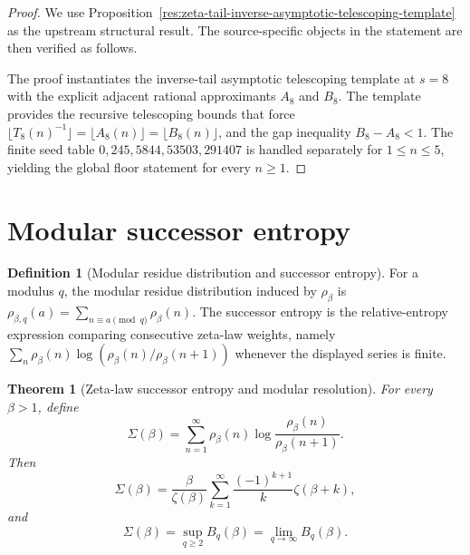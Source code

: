 \documentclass[11pt]{article}
\numberwithin{equation}{section}
\newtheorem{theorem}{Theorem}[section]
\theoremstyle{definition}
\newtheorem{definition}{Definition}[section]
\theoremstyle{remark}
\newcommand{\1}{\mathbf 1}
\begin{document}
\begin{proof}
We use Proposition~\ref{res:zeta-tail-inverse-asymptotic-telescoping-template} as the upstream structural result. The source-specific objects in the statement are then verified as follows.

The proof instantiates the inverse-tail asymptotic telescoping template at \(s=8\) with the explicit adjacent rational approximants \(A_8\) and \(B_8\). The template provides the recursive telescoping bounds that force \(\lfloor T_8(n)^{-1}\rfloor=\lfloor A_8(n)\rfloor=\lfloor B_8(n)\rfloor\), and the gap inequality \(B_8-A_8<1\).  The finite seed table \(0,245,5844,53503,291407\) is handled separately for \(1\le n\le5\), yielding the global floor statement for every \(n\ge1\).
\end{proof}

\section{Modular successor entropy}

\begin{definition}[Modular residue distribution and successor entropy]
\label{def:modular-residue-successor}
For a modulus \(q\), the modular residue distribution induced by \(\rho_\beta\) is \(\rho_{\beta,q}(a)=\sum_{n\equiv a\pmod q}\rho_\beta(n)\). The successor entropy is the relative-entropy expression comparing consecutive zeta-law weights, namely \(\sum_n\rho_\beta(n)\log(\rho_\beta(n)/\rho_\beta(n+1))\) whenever the displayed series is finite.
\end{definition}

\begin{theorem}[Zeta-law successor entropy and modular resolution]
\label{thm:successor-entropy}
For every \(\beta>1\), define
\begin{equation}
\label{eq:successor-entropy}
\Sigma(\beta)=\sum_{n=1}^{\infty}\rho_\beta(n)
\log\frac{\rho_\beta(n)}{\rho_\beta(n+1)}.
\end{equation}
Then
\begin{equation}
\label{eq:successor-entropy-series}
\Sigma(\beta)=
\frac{\beta}{\zeta(\beta)}
\sum_{k=1}^{\infty}\frac{(-1)^{k+1}}{k}\zeta(\beta+k),
\end{equation}
and
\begin{equation}
\label{eq:successor-entropy-modular-resolution}
\Sigma(\beta)=\sup_{q\ge2}B_q(\beta)=\lim_{q\to\infty}B_q(\beta).
\end{equation}
\end{theorem}
\end{document}
